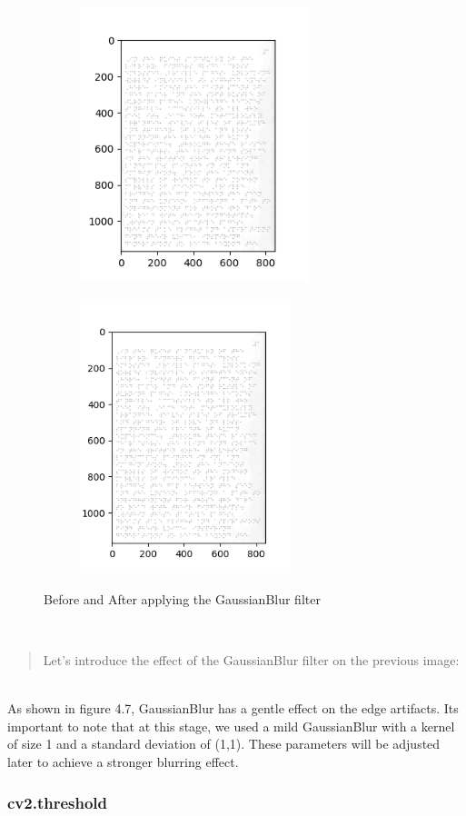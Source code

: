 \begin{figure}[h!]
     \centering
     \begin{subfigure}
         \centering
         \includegraphics[width=.48\textwidth,height=8cm]{image11.png}
     \end{subfigure}
     \hfill
     \begin{subfigure}
         \centering
         \includegraphics[width=.48\textwidth,height=8cm]{image13.png}
     \end{subfigure}
        \caption{Before and After applying the GaussianBlur filter}
        \label{fig:Clear real braille samples}
\end{figure}\\
\begin{quote}
Let's introduce the effect of the GaussianBlur filter on the previous image:
\end{quote}\\

\quad As shown in figure 4.7, GaussianBlur has a gentle effect on the edge
artifacts. It\textquotesingle s important to note
that at this stage, we used a mild GaussianBlur with a kernel of size 1
and a standard deviation of (1,1). These parameters will be adjusted
later to achieve a stronger blurring effect.\\
\newpage
\hypertarget{cv2.threshold}{%
\subsubsection{cv2.threshold}\label{cv2.threshold}}

